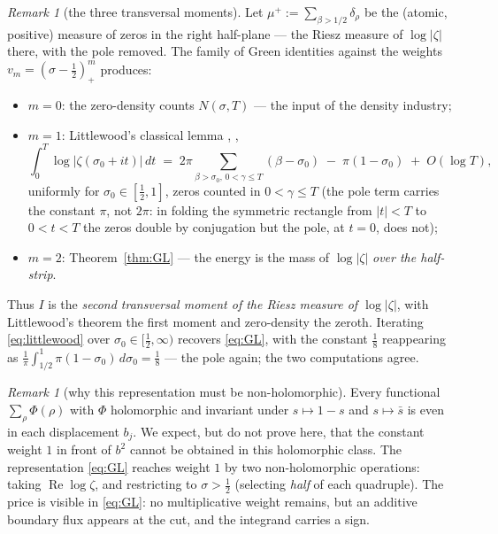\documentclass[11pt]{amsart}
\theoremstyle{plain}
\theoremstyle{definition}
\theoremstyle{remark}
\newtheorem{remark}[theorem]{Remark}
\renewcommand{\Re}{\operatorname{Re}}
\begin{document}
\begin{remark}[the three transversal moments]\label{rem:moments}
Let $\mu^+:=\sum_{\beta>1/2}\delta_\rho$ be the (atomic, positive) measure of zeros in the right half-plane --- the Riesz measure of $\log|\zeta|$ there, with the pole removed. The family of Green identities against the weights $v_m=(\sigma-\tfrac12)_+^m$ produces:
\begin{itemize}
\item $m=0$: the zero-density counts $N(\sigma,T)$ --- the input of the density industry;
\item $m=1$: Littlewood's classical lemma \cite{Littlewood1924}, \cite[\S9.9]{Titchmarsh1986},
\begin{equation}\label{eq:littlewood}
\int_0^T\log|\zeta(\sigma_0+it)|\,dt
\;=\;2\pi\!\!\sum_{\beta>\sigma_0,\,0<\gamma\le T}\!\!(\beta-\sigma_0)\;-\;\pi(1-\sigma_0)\;+\;O(\log T),
\end{equation}
uniformly for $\sigma_0\in[\tfrac12,1]$, zeros counted in $0<\gamma\le T$ (the pole term carries the constant $\pi$, not $2\pi$: in folding the symmetric rectangle from $|t|<T$ to $0<t<T$ the zeros double by conjugation but the pole, at $t=0$, does not);
\item $m=2$: Theorem~\ref{thm:GL} --- the energy is the mass of $\log|\zeta|$ \emph{over the half-strip}.
\end{itemize}
Thus $I$ is the \emph{second transversal moment of the Riesz measure of $\log|\zeta|$}, with Littlewood's theorem the first moment and zero-density the zeroth. Iterating \eqref{eq:littlewood} over $\sigma_0\in[\tfrac12,\infty)$ recovers \eqref{eq:GL}, with the constant $\tfrac18$ reappearing as $\frac1\pi\int_{1/2}^1\pi(1-\sigma_0)\,d\sigma_0=\tfrac18$ --- the pole again; the two computations agree.
\end{remark}

\begin{remark}[why this representation must be non-holomorphic]\label{rem:nonholo}
Every functional $\sum_\rho\Phi(\rho)$ with $\Phi$ holomorphic and invariant under $s\mapsto1-s$ and $s\mapsto\bar s$ is even in each displacement $b_j$. We expect, but do not prove here, that the constant weight $1$ in front of $b^2$ cannot be obtained in this holomorphic class. The representation \eqref{eq:GL} reaches weight $1$ by two non-holomorphic operations: taking $\Re\log\zeta$, and restricting to $\sigma>\tfrac12$ (selecting \emph{half} of each quadruple). The price is visible in \eqref{eq:GL}: no multiplicative weight remains, but an additive boundary flux appears at the cut, and the integrand carries a sign.
\end{remark}
\end{document}
